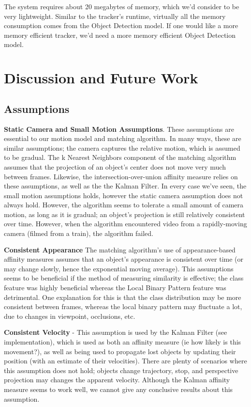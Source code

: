 \documentclass[10pt,twocolumn,letterpaper]{article}
\begin{document}
The system requires about 20 megabytes of memory, which we'd consider to be very lightweight.
Similar to the tracker's runtime, virtually all the memory consumption comes from the Object Detection model.
If one would like a more memory efficient tracker, we'd need a more memory efficient Object Detection model.

\section{Discussion and Future Work}
\label{assumptions_discussion}
\subsection{Assumptions}
\textbf{Static Camera and Small Motion Assumptions}. 
These assumptions are essential to our motion model and matching algorithm.
In many ways, these are similar assumptions; the camera captures the relative motion, which is assumed to be gradual.
The k Nearest Neighbors component of the matching algorithm assumes that the projection of an object's center does not move very much between frames.
Likewise, the intersection-over-union affinity measure relies on these assumptions, as well as the the Kalman Filter.
In every case we've seen, the small motion assumptions holds, however the static camera assumption does not always hold.
However, the algorithm seems to tolerate a small amount of camera motion, as long as it is gradual; an object's projection is still relatively consistent over time.
However, when the algorithm encountered video from a rapidly-moving camera (filmed from a train), the algorithm failed.

\textbf{Consistent Appearance}
The matching algorithm's use of appearance-based affinity measures assumes that an object's appearance is consistent over time (or may change slowly, hence the exponential moving average).
This assumptions seems to be beneficial if the method of measuring similarity is effective; the class feature was highly beneficial whereas the Local Binary Pattern feature was detrimental.
One explanation for this is that the class distribution may be more consistent between frames, whereas the local binary pattern may fluctuate a lot, due to changes in viewpoint, occlusions, etc.

\textbf{Consistent Velocity} - This assumption is used by the Kalman Filter (see implementation), which is used as both an affinity measure (ie how likely is this movement?), as well as being used to propagate lost objects by updating their position (with an estimate of their velocities).
There are plenty of scenarios where this assumption does not hold; objects change trajectory, stop, and perspective projection may changes the apparent velocity.
Although the Kalman affinity measure seems to work well, we cannot give any conclusive results about this assumption.
\end{document}

